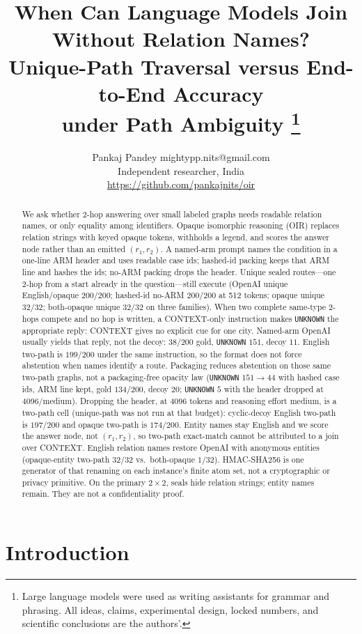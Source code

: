 \documentclass[10pt]{article} %
\title{When Can Language Models Join\\
Without Relation Names?\\
Unique-Path Traversal versus End-to-End Accuracy\\
under Path Ambiguity%
\thanks{Large language models were used as writing assistants for grammar
and phrasing. All ideas, claims, experimental design, locked numbers, and
scientific conclusions are the authors'.}}
\author{\name Pankaj Pandey \email mightypp.nits@gmail.com \\
 \addr Independent researcher, India \\
 \url{https://github.com/pankajnits/oir}}
\begin{document}
\maketitle

\begin{abstract}
We ask whether 2-hop answering over small labeled graphs needs readable
relation names, or only equality among identifiers.
Opaque isomorphic reasoning (OIR) replaces relation strings with keyed
opaque tokens, withholds a legend, and scores the answer node rather than
an emitted $(r_1,r_2)$.
A named-arm prompt names the condition in a one-line ARM header and uses
readable case ids; hashed-id packing keeps that ARM line and hashes the
ids; no-ARM packing drops the header.
Unique sealed routes---one 2-hop from a start already in the
question---still execute
(OpenAI unique English/opaque $200/200$;
hashed-id no-ARM $200/200$ at 512 tokens;
opaque unique $32/32$;
both-opaque unique $32/32$ on three families).
When two complete same-type 2-hops compete and no hop is written, a
CONTEXT-only instruction makes \texttt{UNKNOWN} the appropriate reply:
CONTEXT gives no explicit cue for one city.
Named-arm OpenAI usually yields that reply, not the decoy: $38/200$ gold,
\texttt{UNKNOWN} $151$, decoy $11$.
English two-path is $199/200$ under the same instruction, so the format
does not force abstention when names identify a route.
Packaging reduces abstention on those same two-path graphs, not a
packaging-free opacity law
(\texttt{UNKNOWN} $151\to 44$ with hashed case ids, ARM line kept,
gold $134/200$, decoy $20$;
\texttt{UNKNOWN} $5$ with the header dropped at 4096/medium).
Dropping the header, at 4096 tokens and reasoning effort medium, is a
two-path cell (unique-path was not run at that budget):
cyclic-decoy English two-path is $197/200$ and opaque two-path is
$174/200$.
Entity names stay English and we score the answer node, not $(r_1,r_2)$,
so two-path exact-match cannot be attributed to a join over CONTEXT.
English relation names restore OpenAI with anonymous entities
(opaque-entity two-path $32/32$ vs.\ both-opaque $1/32$).
HMAC-SHA256 is one generator of that renaming on each instance's finite
atom set, not a cryptographic or privacy primitive.
On the primary $2{\times}2$, seals hide relation strings; entity names
remain. They are not a confidentiality proof.
\end{abstract}

\section{Introduction}
\end{document}
